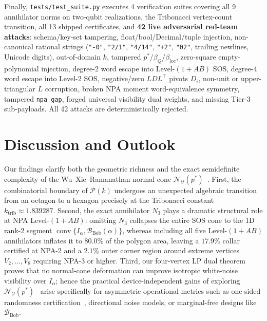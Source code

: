 \documentclass[11pt,a4paper]{article}
\newcommand{\calN}{\mathcal{N}_{\mathcal{Q}}}
\newcommand{\calP}{\mathcal{P}}
\newcommand{\calB}{\mathcal{B}}
\newcommand{\conv}{\operatorname{conv}}
\begin{document}
Finally, \texttt{tests/test\_suite.py} executes 4 verification suites covering all 9 annihilator norms on two-qubit realizations, the Tribonacci vertex-count transition, all 13 shipped certificates, and \textbf{42 live adversarial red-team attacks}: schema/key-set tampering, float/bool/Decimal/tuple injection, non-canonical rational strings (\texttt{"-0"}, \texttt{"2/1"}, \texttt{"4/14"}, \texttt{"+2"}, \texttt{"02"}, trailing newlines, Unicode digits), out-of-domain $k$, tampered $p^*$/$\beta_Q$/$\beta_{\mathrm{loc}}$, zero-square empty-polynomial injection, degree-2 word escape into Level-$(1+AB)$ SOS, degree-4 word escape into Level-2 SOS, negative/zero $LDL^\top$ pivots $D_i$, non-unit or upper-triangular $L$ corruption, broken NPA moment word-equivalence symmetry, tampered \texttt{npa\_gap}, forged universal visibility dual weights, and missing Tier-3 sub-payloads. All 42 attacks are deterministically rejected.

\section{Discussion and Outlook}
\label{sec:discussion}

Our findings clarify both the geometric richness and the exact semidefinite complexity of the Wu--Xie--Ramanathan normal cone $\calN(p^*)$~\cite{wu2026normalcone}.
First, the combinatorial boundary of $\calP(k)$ undergoes an unexpected algebraic transition from an octagon to a hexagon precisely at the Tribonacci constant $k_{\mathrm{trib}} \approx 1.839287$.
Second, the exact annihilator $N_3$ plays a dramatic structural role at NPA Level-$(1+AB)$: omitting $N_3$ collapses the entire SOS cone to the 1D rank-2 segment $\conv\{I_\alpha, \calB_{\mathrm{Bob}}(\alpha)\}$, whereas including all five Level-$(1+AB)$ annihilators inflates it to $80.0\%$ of the polygon area, leaving a $17.9\%$ collar certified at NPA-2 and a $2.1\%$ outer corner region around extreme vertices $V_2, \dots, V_8$ requiring NPA-3 or higher.
Third, our four-vertex LP dual theorem proves that no normal-cone deformation can improve isotropic white-noise visibility over $I_\alpha$; hence the practical device-independent gains of exploring $\calN(p^*)$~\cite{wu2026normalcone} arise specifically for asymmetric operational metrics such as one-sided randomness certification~\cite{wooltorton2022tight}, directional noise models, or marginal-free designs like $\calB_{\mathrm{Bob}}$.
\end{document}
